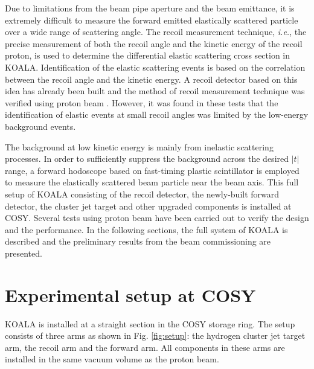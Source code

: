 \documentclass[number,5p]{elsarticle}
\begin{document}
Due to limitations from the beam pipe aperture and the beam emittance,
it is extremely difficult to measure the forward emitted elastically scattered particle over a wide range of scattering angle.
The recoil measurement technique, \textit{i.e.}, the precise measurement of both the recoil angle and the kinetic energy of the recoil proton, 
is used to determine the differential elastic scattering cross section in KOALA.
Identification of the elastic scattering events is based on the correlation between the recoil angle and the kinetic energy.
A recoil detector based on this idea has already been built and the method of
recoil measurement technique was verified using proton beam
\cite{koala_article,recoil_article}.
However, it was found in these tests that the identification of elastic events at small recoil angles was limited by the low-energy background events.

The background at low kinetic energy is mainly from inelastic scattering processes.
In order to sufficiently suppress the background across the desired $|t|$ range,
a forward hodoscope based on fast-timing plastic scintillator is
employed to measure the elastically scattered beam particle near the beam axis.
This full setup of KOALA consisting of the recoil detector, the newly-built
forward detector, the cluster jet target and other upgraded components is installed at COSY.
Several tests using proton beam have been carried out to verify the design and the performance.
In the following sections,  the full system of KOALA is described and the preliminary results from the beam commissioning are presented.

\section{Experimental setup at COSY}
\label{sec:setup}

KOALA is installed at a straight section in the COSY storage ring.
The setup consists of three arms as shown in Fig. \ref{fig:setup}: the hydrogen
cluster jet target arm, the recoil arm and the forward arm.
All components in these arms are installed in the same vacuum volume as the
proton beam.
\end{document}
